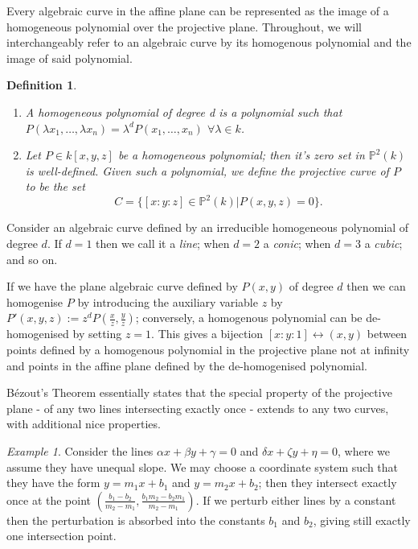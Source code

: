 \documentclass{article}
\newtheorem*{definition}{Definition}
\theoremstyle{remark}
\newtheorem{example}{Example}[section]
\begin{document}
Every algebraic curve in the affine plane can be represented as the image of a homogeneous polynomial over the projective plane. Throughout, we will interchangeably refer to an algebraic curve by its homogenous polynomial and the image of said polynomial.

\begin{definition} \begin{enumerate}
\item A \textit{homogeneous polynomial} of degree \textit{d} is a polynomial such that $P(\lambda x_1,\ldots ,\lambda x_n)=\lambda ^{d}P(x_1,\ldots ,x_n)$ $\forall \lambda \in k$.
\item Let $P\in k[x,y,z]$ be a homogeneous polynomial; then it's zero set in $\mathbb{P}^{2}(k)$ is well-defined. Given such a polynomial, we define the \textit{projective curve} of $P$ to be the set \[C=\{ [x:y:z]\in \mathbb{P}^{2}(k) | P(x,y,z)=0\}.\]
\end{enumerate}
\end{definition}
Consider an algebraic curve defined by an irreducible homogeneous polynomial of degree $d$. If $d=1$ then we call it a \textit{line}; when $d=2$ a \textit{conic}; when $d=3$ a \textit{cubic}; and so on.

If we have the plane algebraic curve defined by $P(x,y)$ of degree $d$ then we can homogenise $P$ by introducing the auxiliary variable $z$ by $P'(x,y,z):=z^d P(\frac{x}{z},\frac{y}{z})$; conversely, a homogenous polynomial can be de-homogenised by setting $z=1$. This gives a bijection $[x:y:1]\leftrightarrow (x,y)$ between points defined by a homogenous polynomial in the projective plane not at infinity and points in the affine plane defined by the de-homogenised polynomial.
\par
Bézout's Theorem essentially states that the special property of the projective plane - of any two lines intersecting exactly once - extends to any two curves, with additional nice properties. \\
\begin{example} Consider the lines $\alpha x +\beta y + \gamma =0 $ and $\delta x +\zeta y + \eta =0$, where we assume they have unequal slope. We may choose a coordinate system such that they have the form $y=m_1 x+b_1$ and $y=m_2 x +b_2$; then they intersect exactly once at the point $(\frac{b_1-b_2}{m_2 - m_1},\frac{b_1 m_2 - b_2 m_1}{m_2 - m_1})$. If we perturb either lines by a constant then the perturbation is absorbed into the constants $b_1$ and $b_2$, giving still exactly one intersection point.
\end{example}
\end{document}
